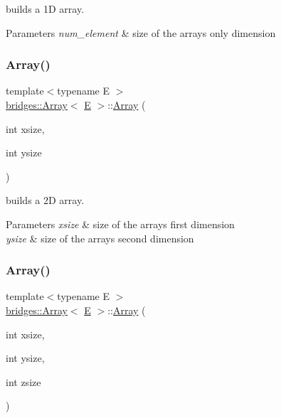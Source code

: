 builds a 1D array. 
\begin{DoxyParams}{Parameters}
{\em num\+\_\+element} & size of the array\textquotesingle{}s only dimension \\
\hline
\end{DoxyParams}
\mbox{\label{classbridges_1_1_array_a13b26fc4d2ccb19b277b2acc615efce2}} 
\subsubsection{\texorpdfstring{Array()}{Array()}\hspace{0.1cm}{\footnotesize\ttfamily [4/6]}}
{\footnotesize\ttfamily template$<$typename E $>$ \\
\mbox{\hyperlink{classbridges_1_1_array}{bridges\+::\+Array}}$<$ \mbox{\hyperlink{namespacebridges_acfb0a4f7877d8f63de3e6862004c50eda3a3ea00cfc35332cedf6e5e9a32e94da}{E}} $>$\+::\mbox{\hyperlink{classbridges_1_1_array}{Array}} (\begin{DoxyParamCaption}\item[{int}]{xsize,  }\item[{int}]{ysize }\end{DoxyParamCaption})\hspace{0.3cm}{\ttfamily [inline]}}

builds a 2D array. 
\begin{DoxyParams}{Parameters}
{\em xsize} & size of the array\textquotesingle{}s first dimension \\
\hline
{\em ysize} & size of the array\textquotesingle{}s second dimension \\
\hline
\end{DoxyParams}
\mbox{\label{classbridges_1_1_array_a3504e71cacffd343edf8b9ea16f75eb4}} 
\subsubsection{\texorpdfstring{Array()}{Array()}\hspace{0.1cm}{\footnotesize\ttfamily [5/6]}}
{\footnotesize\ttfamily template$<$typename E $>$ \\
\mbox{\hyperlink{classbridges_1_1_array}{bridges\+::\+Array}}$<$ \mbox{\hyperlink{namespacebridges_acfb0a4f7877d8f63de3e6862004c50eda3a3ea00cfc35332cedf6e5e9a32e94da}{E}} $>$\+::\mbox{\hyperlink{classbridges_1_1_array}{Array}} (\begin{DoxyParamCaption}\item[{int}]{xsize,  }\item[{int}]{ysize,  }\item[{int}]{zsize }\end{DoxyParamCaption})\hspace{0.3cm}{\ttfamily [inline]}}

